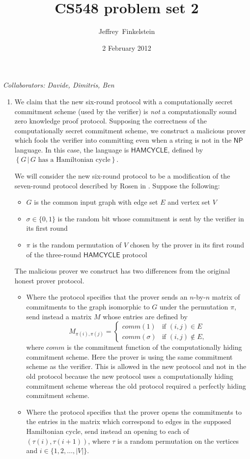 \documentclass{article}
\author{Jef{}frey~Finkelstein}
\date{2 February 2012}
\title{CS548 problem set 2}
\newcommand{\collaborators}[1]{\emph{Collaborators: #1}}
\newcommand{\class}[1]{{\ensuremath{\mathsf{#1}}}}
\newcommand{\lang}[1]{{\ensuremath{\mathsf{#1}}}}
\newcommand{\NP}{\class{NP}}
\begin{document}
\maketitle
\collaborators{Davide, Dimitris, Ben}
\begin{enumerate}

\item
  We claim that the new six-round protocol with a computationally secret commitment scheme (used by the verifier) is \emph{not} a computationally sound zero knowledge proof protocol.
  Supposing the correctness of the computationally secret commitment scheme, we construct a malicious prover which fools the verifier into committing even when a string is not in the $\NP$ language.
  In this case, the language is \lang{HAMCYCLE}, defined by $\left\{G \,|\, G\text{ has a Hamiltonian cycle}\right\}$.

  We will consider the new six-round protocol to be a modification of the seven-round protocol described by Rosen in \cite[Figure 2]{rosen}.
  Suppose the following:
  \begin{itemize}
  \item $G$ is the common input graph with edge set $E$ and vertex set $V$
  \item $\sigma\in\{0,1\}$ is the random bit whose commitment is sent by the verifier in its first round
  \item $\pi$ is the random permutation of $V$ chosen by the prover in its first round of the three-round \lang{HAMCYCLE} protocol
  \end{itemize}
  The malicious prover we construct has two differences from the original honest prover protocol.
  \begin{itemize}
  \item Where the protocol specifies that the prover sends an $n$-by-$n$ matrix of commitments to the graph isomorphic to $G$ under the permutation $\pi$, send instead a matrix $M$ whose entries are defined by
    \begin{displaymath}
      M_{\pi(i),\pi(j)} =
      \begin{cases}
        comm(1) & \text{if } (i, j)\in E \\
        comm(\sigma) & \text{if } (i, j)\notin E,
      \end{cases}
    \end{displaymath}
    where $comm$ is the commitment function of the computationally hiding commitment scheme.
    Here the prover is using the same commitment scheme as the verifier.
    This is allowed in the new protocol and not in the old protocol because the new protocol uses a computationally hiding commitment scheme whereas the old protocol required a perfectly hiding commitment scheme.
  \item Where the protocol specifies that the prover opens the commitments to the entries in the matrix which correspond to edges in the supposed Hamiltonian cycle, send instead an opening to each of $(\tau(i),\tau(i+1))$, where $\tau$ is a random permutation on the vertices and $i\in\{1, 2, \ldots, |V|\}$.
  \end{itemize}


\end{enumerate}
\end{document}
